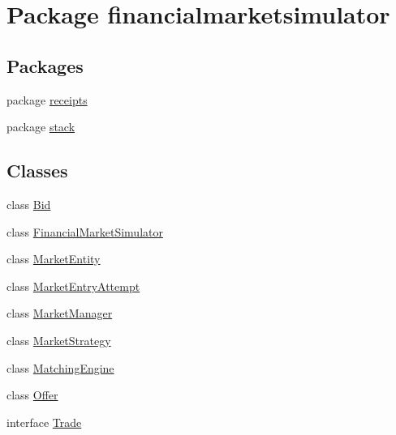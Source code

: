 \hypertarget{namespacefinancialmarketsimulator}{\section{Package financialmarketsimulator}
\label{namespacefinancialmarketsimulator}
}
\subsection*{Packages}
\begin{DoxyCompactItemize}
\item 
package \hyperlink{namespacefinancialmarketsimulator_1_1receipts}{receipts}
\item 
package \hyperlink{namespacefinancialmarketsimulator_1_1stack}{stack}
\end{DoxyCompactItemize}
\subsection*{Classes}
\begin{DoxyCompactItemize}
\item 
class \hyperlink{classfinancialmarketsimulator_1_1_bid}{Bid}
\item 
class \hyperlink{classfinancialmarketsimulator_1_1_financial_market_simulator}{Financial\+Market\+Simulator}
\item 
class \hyperlink{classfinancialmarketsimulator_1_1_market_entity}{Market\+Entity}
\item 
class \hyperlink{classfinancialmarketsimulator_1_1_market_entry_attempt}{Market\+Entry\+Attempt}
\item 
class \hyperlink{classfinancialmarketsimulator_1_1_market_manager}{Market\+Manager}
\item 
class \hyperlink{classfinancialmarketsimulator_1_1_market_strategy}{Market\+Strategy}
\item 
class \hyperlink{classfinancialmarketsimulator_1_1_matching_engine}{Matching\+Engine}
\item 
class \hyperlink{classfinancialmarketsimulator_1_1_offer}{Offer}
\item 
interface \hyperlink{interfacefinancialmarketsimulator_1_1_trade}{Trade}
\end{DoxyCompactItemize}
